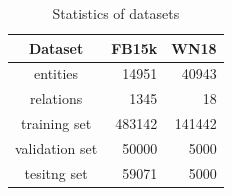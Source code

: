 \documentclass[twocolumn,a4paper,preprint,10pt,3p]{elsarticle}
\begin{document}

\begin{table}[hbtp]
    \centering
    \begin{tabular}{crr}
        \toprule
        Dataset & FB15k & WN18 \\
        \midrule
        entities &  14951   &  40943  \\
        relations &  1345   & 18 \\
        training set &  483142   & 141442 \\
        validation set &  50000   & 5000 \\
        tesitng set &  59071  & 5000 \\
        \bottomrule
    \end{tabular}
    \caption{Statistics of datasets}
\label{datasets}
\end{table}
\end{document}
